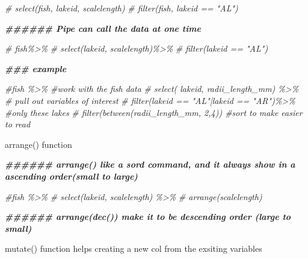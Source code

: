 \documentclass[
]{article}
\newenvironment{Shaded}{\begin{snugshade}}{\end{snugshade}}
\newcommand{\CommentTok}[1]{\textcolor[rgb]{0.56,0.35,0.01}{\textit{#1}}}
\newcommand{\DocumentationTok}[1]{\textcolor[rgb]{0.56,0.35,0.01}{\textbf{\textit{#1}}}}
\begin{document}
\begin{Shaded}
\begin{Highlighting}[]
\CommentTok{\# select(fish, lakeid, scalelength)}
\CommentTok{\# filter(fish, lakeid == "AL")}

\DocumentationTok{\#\#\#\#\#\# Pipe can call the data at one time}

\CommentTok{\# fish\%\textgreater{}\%}
\CommentTok{\# select(lakeid, scalelength)\%\textgreater{}\%}
\CommentTok{\# filter(lakeid == "AL")}


\DocumentationTok{\#\#\# example}

\CommentTok{\#fish \%\textgreater{}\% \#work with the fish data}
\CommentTok{\#  select( lakeid, radii\_length\_mm) \%\textgreater{}\% \# pull out variables of interest}
\CommentTok{\#  filter(lakeid == "AL"|lakeid ==  "AR")\%\textgreater{}\% \#only these lakes}
\CommentTok{\#  filter(between(radii\_length\_mm, 2,4)) \#sort to make easier to read}
\end{Highlighting}
\end{Shaded}

arrange() function

\begin{Shaded}
\begin{Highlighting}[]
\DocumentationTok{\#\#\#\#\#\# arrange() like a sord command, and it always show in a ascending order(small to large)}

\CommentTok{\#fish \%\textgreater{}\% }
\CommentTok{\#  select(lakeid, scalelength) \%\textgreater{}\% }
\CommentTok{\#  arrange(scalelength)}

\DocumentationTok{\#\#\#\#\#\# arrange(dec()) make it to be descending order (large to small)}
\end{Highlighting}
\end{Shaded}

mutate() function helps creating a new col from the exsiting variables
\end{document}
